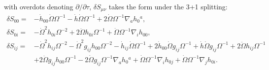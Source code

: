 \documentclass[10pt,letterpaper]{article}
\numberwithin{equation}{subsection}
\begin{document}
with overdots denoting $\partial/\partial \tau$, 
 $\delta S_{\mu\nu}$ takes the form under the 3+1 splitting:
\begin{align}
\delta S_{00}={}&- \dot{h}_{00} \dot{\Omega} \Omega^{-1}
 -  \dot{h} \dot{\Omega} \Omega^{-1}
 + 2 \dot{\Omega} \Omega^{-1} \nabla_{a}h_{0}{}^{a},
\\
\delta S_{0i}={}&- \dot{\Omega}^2 h_{0i} \Omega^{-2}
 + 2 \ddot{\Omega} h_{0i} \Omega^{-1}
 + \dot{\Omega} \Omega^{-1} \nabla_{i}h_{00},
\\
\delta S_{ij}={}&- \dot{\Omega}^2 h_{ij} \Omega^{-2}
 -  \dot{\Omega}^2 g_{ij} h_{00} \Omega^{-2}
 -  \dot{h}_{ij} \dot{\Omega} \Omega^{-1}
 + 2 \dot{h}_{00} \dot{\Omega} g_{ij} \Omega^{-1}
 + \dot{h} \dot{\Omega} g_{ij} \Omega^{-1}
 + 2 \ddot{\Omega} h_{ij} \Omega^{-1}\nonumber\\
& + 2 \ddot{\Omega} g_{ij} h_{00} \Omega^{-1}
 - 2 \dot{\Omega} g_{ij} \Omega^{-1} \nabla_{a}h_{0}{}^{a}
 + \dot{\Omega} \Omega^{-1} \nabla_{i}h_{0j}
 + \dot{\Omega} \Omega^{-1} \nabla_{j}h_{0i}.
\end{align}
\end{document}
